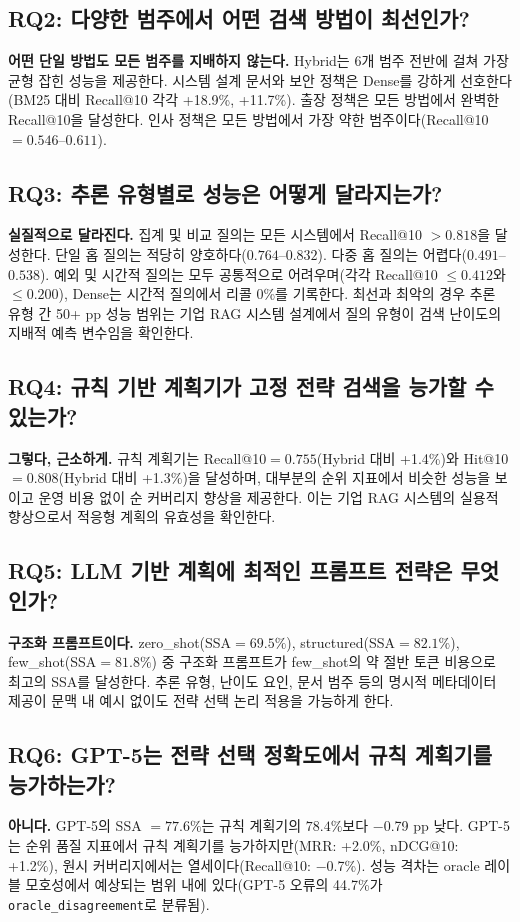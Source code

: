 \subsection*{RQ2: 다양한 범주에서 어떤 검색 방법이 최선인가?}
\textbf{어떤 단일 방법도 모든 범주를 지배하지 않는다.} Hybrid는 6개 범주 전반에 걸쳐 가장 균형 잡힌 성능을 제공한다. 시스템 설계 문서와 보안 정책은 Dense를 강하게 선호한다(BM25 대비 Recall@10 각각 +18.9\%, +11.7\%). 출장 정책은 모든 방법에서 완벽한 Recall@10을 달성한다. 인사 정책은 모든 방법에서 가장 약한 범주이다(Recall@10 $={0.546}$--$0.611$).

\subsection*{RQ3: 추론 유형별로 성능은 어떻게 달라지는가?}
\textbf{실질적으로 달라진다.} 집계 및 비교 질의는 모든 시스템에서 Recall@10 $>{0.818}$을 달성한다. 단일 홉 질의는 적당히 양호하다($0.764$--$0.832$). 다중 홉 질의는 어렵다($0.491$--$0.538$). 예외 및 시간적 질의는 모두 공통적으로 어려우며(각각 Recall@10 $\leq{0.412}$와 $\leq{0.200}$), Dense는 시간적 질의에서 리콜 0\%를 기록한다. 최선과 최악의 경우 추론 유형 간 50+ pp 성능 범위는 기업 RAG 시스템 설계에서 질의 유형이 검색 난이도의 지배적 예측 변수임을 확인한다.

\subsection*{RQ4: 규칙 기반 계획기가 고정 전략 검색을 능가할 수 있는가?}
\textbf{그렇다, 근소하게.} 규칙 계획기는 Recall@10$={0.755}$(Hybrid 대비 +1.4\%)와 Hit@10$={0.808}$(Hybrid 대비 +1.3\%)을 달성하며, 대부분의 순위 지표에서 비슷한 성능을 보이고 운영 비용 없이 순 커버리지 향상을 제공한다. 이는 기업 RAG 시스템의 실용적 향상으로서 적응형 계획의 유효성을 확인한다.

\subsection*{RQ5: LLM 기반 계획에 최적인 프롬프트 전략은 무엇인가?}
\textbf{구조화 프롬프트이다.} zero\_shot(SSA$={69.5\%}$), structured(SSA$={82.1\%}$), few\_shot(SSA$={81.8\%}$) 중 구조화 프롬프트가 few\_shot의 약 절반 토큰 비용으로 최고의 SSA를 달성한다. 추론 유형, 난이도 요인, 문서 범주 등의 명시적 메타데이터 제공이 문맥 내 예시 없이도 전략 선택 논리 적용을 가능하게 한다.

\subsection*{RQ6: GPT-5는 전략 선택 정확도에서 규칙 계획기를 능가하는가?}
\textbf{아니다.} GPT-5의 SSA $={77.6\%}$는 규칙 계획기의 $78.4\%$보다 $-$0.79 pp 낮다. GPT-5는 순위 품질 지표에서 규칙 계획기를 능가하지만(MRR: +2.0\%, nDCG@10: +1.2\%), 원시 커버리지에서는 열세이다(Recall@10: $-$0.7\%). 성능 격차는 oracle 레이블 모호성에서 예상되는 범위 내에 있다(GPT-5 오류의 44.7\%가 \texttt{oracle\_disagreement}로 분류됨).


